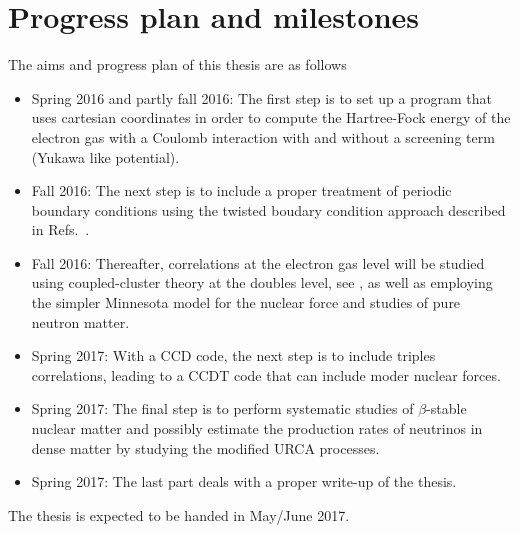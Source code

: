 \documentclass[aps,prc,twocolumn,showpacs,floatfix,nofootinbib,preprintnumbers,superscriptaddress,amsmath,amssymb]{revtex4-1}
\begin{document}
\section*{Progress plan and milestones}
The aims and progress plan of this thesis are as follows
\begin{itemize}
\item Spring 2016 and partly fall 2016:  The first step is to set up a program that uses cartesian coordinates in order to compute the Hartree-Fock 
energy of the electron gas with a Coulomb interaction with and without a screening term (Yukawa like potential). 
\item Fall 2016:  The next step is to include a proper treatment of periodic boundary conditions using the twisted boudary condition
approach described in Refs.~\cite{gros1992,gros1996,lin2001}.
\item Fall 2016: Thereafter, correlations at the electron gas level
  will be studied using coupled-cluster theory at the doubles level,
  see \cite{shavittbartlett2009}, as well as employing the simpler Minnesota model for the nuclear force and studies of pure neutron matter.
\item Spring 2017: With a CCD code, the next step is to include triples correlations, leading to a CCDT code that can include moder nuclear forces.
\item Spring 2017: The final step is to perform systematic studies of  $\beta$-stable nuclear matter and possibly estimate the production rates of neutrinos in dense matter by studying the modified URCA processes. 
\item Spring 2017: The last part deals with a proper write-up of the thesis. 
\end{itemize}
 
The thesis is expected to be handed in May/June 2017.
\end{document}
